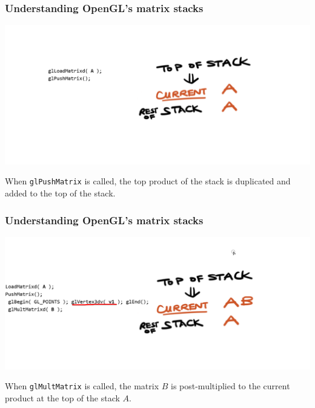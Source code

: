 \documentclass{beamer}
\begin{document}
\begin{frame}
    \frametitle{Understanding OpenGL's matrix stacks}

    \begin{center}
        \includegraphics[scale=0.4]{q8-2.png}
    \end{center}

    When \texttt{glPushMatrix} is called, the top product of the stack is 
    duplicated and added to the top of the stack.

\end{frame}

\begin{frame}
    \frametitle{Understanding OpenGL's matrix stacks}

    \begin{center}
        \includegraphics[scale=0.4]{q8-3.png}
    \end{center}

    When \texttt{glMultMatrix} is called, the matrix $B$ is post-multiplied to the current
    product at the top of the stack $A$.

\end{frame}
\end{document}
